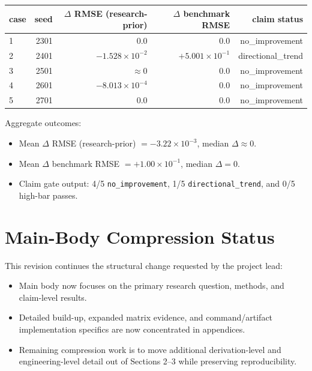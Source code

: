 \documentclass[11pt]{article}
\begin{document}
\begin{center}
\begin{tabular}{lrrrr}
\hline
case & seed & $\Delta$ RMSE (research-prior) & $\Delta$ benchmark RMSE & claim status \\
\hline
1 & 2301 & $0.0$ & $0.0$ & no\_improvement \\
2 & 2401 & $-1.528\times 10^{-2}$ & $+5.001\times 10^{-1}$ & directional\_trend \\
3 & 2501 & $\approx 0$ & $0.0$ & no\_improvement \\
4 & 2601 & $-8.013\times 10^{-4}$ & $0.0$ & no\_improvement \\
5 & 2701 & $0.0$ & $0.0$ & no\_improvement \\
\hline
\end{tabular}
\end{center}

Aggregate outcomes:
\begin{itemize}
\item Mean $\Delta$ RMSE (research-prior) $=-3.22\times 10^{-3}$, median $\Delta \approx 0$.
\item Mean $\Delta$ benchmark RMSE $=+1.00\times 10^{-1}$, median $\Delta=0$.
\item Claim gate output: 4/5 \texttt{no\_improvement}, 1/5 \texttt{directional\_trend}, and 0/5 high-bar passes.
\end{itemize}

\section{Main-Body Compression Status}
This revision continues the structural change requested by the project lead:
\begin{itemize}
\item Main body now focuses on the primary research question, methods, and claim-level results.
\item Detailed build-up, expanded matrix evidence, and command/artifact implementation specifics are now concentrated in appendices.
\item Remaining compression work is to move additional derivation-level and engineering-level detail out of Sections 2--3 while preserving reproducibility.
\end{itemize}
\end{document}
